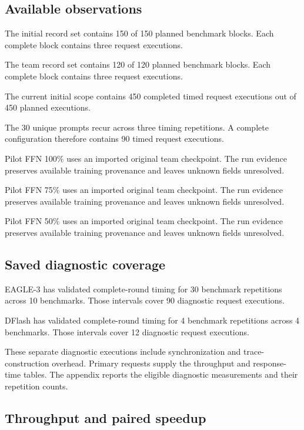 \subsection{Available observations}

The initial record set contains 150 of 150 planned benchmark blocks. Each complete block contains three request executions.

The team record set contains 120 of 120 planned benchmark blocks. Each complete block contains three request executions.

The current initial scope contains 450 completed timed request executions out of 450 planned executions.

The 30 unique prompts recur across three timing repetitions. A complete configuration therefore contains 90 timed request executions.

Pilot FFN 100\% uses an imported original team checkpoint. The run evidence preserves available training provenance and leaves unknown fields unresolved.

Pilot FFN 75\% uses an imported original team checkpoint. The run evidence preserves available training provenance and leaves unknown fields unresolved.

Pilot FFN 50\% uses an imported original team checkpoint. The run evidence preserves available training provenance and leaves unknown fields unresolved.

\subsection{Saved diagnostic coverage}

EAGLE-3 has validated complete-round timing for 30 benchmark repetitions across 10 benchmarks. Those intervals cover 90 diagnostic request executions.

DFlash has validated complete-round timing for 4 benchmark repetitions across 4 benchmarks. Those intervals cover 12 diagnostic request executions.

These separate diagnostic executions include synchronization and trace-construction overhead. Primary requests supply the throughput and response-time tables. The appendix reports the eligible diagnostic measurements and their repetition counts.

\subsection{Throughput and paired speedup}

